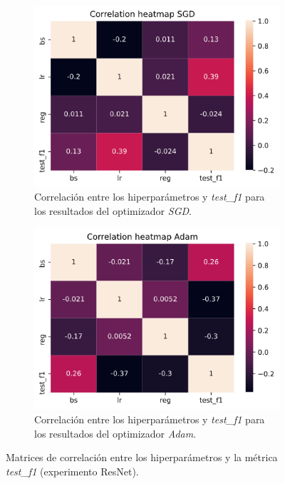 \begin{figure}[H]
\begin{subfigure}[b]{.5\textwidth}
  \centering
  \includegraphics[width=.8\linewidth]{imagenes/06_Experimentacion/resnet/resnetsgdcorr.png}
  \caption{Correlación entre los hiperparámetros y \textit{test\_f1} para los resultados del optimizador \textit{SGD}.}
  \label{fig:resnetsgdcorr}
\end{subfigure}
\begin{subfigure}[b]{.5\textwidth}
  \centering
  \includegraphics[width=.8\linewidth]{imagenes/06_Experimentacion/resnet/resnetadamcorr.png}
  \caption{Correlación entre los hiperparámetros y \textit{test\_f1} para los resultados del optimizador \textit{Adam}.}
  \label{fig:resnetadamcorr}
\end{subfigure}

\caption{Matrices de correlación entre los hiperparámetros y la métrica \textit{test\_f1} (experimento ResNet).}
\label{fig:resnetcorrelationmatrices}
\end{figure}

